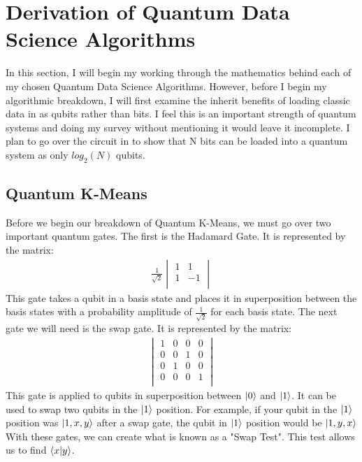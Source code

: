 \documentclass[conference]{IEEEtran}
\begin{document}
\section{Derivation of Quantum Data Science Algorithms}
In this section, I will begin my working through the mathematics behind each of my chosen Quantum Data Science Algorithms. However, before I begin my algorithmic breakdown, I will first examine the inherit benefits of loading classic data in as qubits rather than bits. I feel this is an important strength of quantum systems and doing my survey without mentioning it would leave it incomplete. I plan to go over the circuit in \cite{b12} to show that N bits can be loaded into a quantum system as only $log_2(N)$ qubits.   
\subsection{Quantum K-Means}
Before we begin our breakdown of Quantum K-Means, we must go over two important quantum gates. The first is the Hadamard Gate. It is represented by the matrix:
\begin{align*}
\frac{1}{\sqrt{2}}
    \begin{vmatrix}
    1 & 1 \\
    1 & -1 \\
    \end{vmatrix} 
\end{align*} 
This gate takes a qubit in a basis state and places it in superposition between the basis states with a probability amplitude of $\frac{1}{\sqrt{2}}$ for each basis state. The next gate we will need is the swap gate. It is represented by the matrix: \begin{align*}
    \begin{vmatrix}
    1 & 0 & 0 & 0 \\
    0 & 0 & 1 & 0 \\
    0 & 1 & 0 & 0 \\
    0 & 0 & 0 & 1\\
    \end{vmatrix} 
\end{align*} 
This gate is applied to qubits in superposition between $\ket{0}$ and $\ket{1}$. It can be used to swap two qubits in the $\ket{1}$ position. For example, if your qubit in the $\ket{1}$ position was $\ket{1,x,y}$ after a swap gate, the qubit in $\ket{1}$ position would be $\ket{1,y,x}$ \cite{b5}
\newline
\indent With these gates, we can create what is known as a "Swap Test". This test allows us to find $\bra{x}\ket{y}$. \newline
\end{document}
